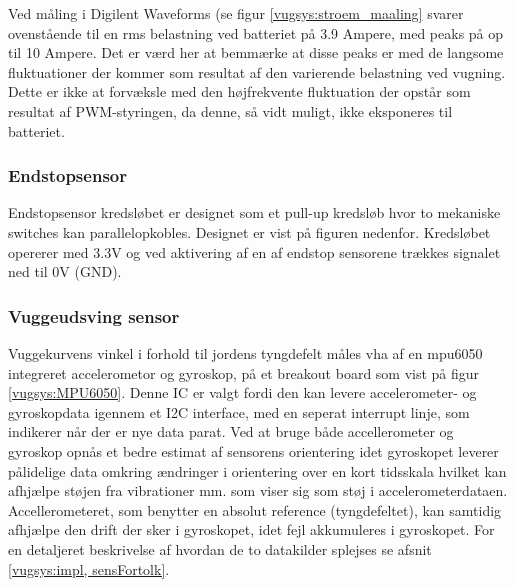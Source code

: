 
Ved måling i Digilent Waveforms (se figur \ref{vugsys:stroem_maaling} svarer ovenstående til en rms belastning ved batteriet på 3.9 Ampere, med peaks på op til 10 Ampere. Det er værd her at bemmærke at disse peaks er med de langsome fluktuationer der kommer som resultat af den varierende belastning ved vugning. Dette er ikke at forvæksle med den højfrekvente fluktuation der opstår som resultat af PWM-styringen, da denne, så vidt muligt, ikke eksponeres til batteriet. 



\subsubsection{Endstopsensor}\label{Vuggesystem: Design_ES} 
Endstopsensor kredsløbet er designet som et pull-up kredsløb hvor to mekaniske switches kan parallelopkobles. Designet er vist på figuren nedenfor.
Kredsløbet opererer med 3.3V og ved aktivering af en af endstop sensorene trækkes signalet ned til 0V (GND).

\subsubsection{Vuggeudsving sensor}
\label{Vuggesystem: Design_Vugggeudsving_sensor} 
Vuggekurvens vinkel i forhold til jordens tyngdefelt måles vha af en mpu6050 integreret accelerometor og gyroskop, på et breakout board som vist på figur \ref{vugsys:MPU6050}. Denne IC er valgt fordi den kan levere accelerometer- og gyroskopdata igennem et I2C interface, med en seperat interrupt linje, som indikerer når der er nye data parat. Ved at bruge både accellerometer og gyroskop opnås et bedre estimat af sensorens orientering idet gyroskopet leverer pålidelige data omkring ændringer i orientering over en kort tidsskala hvilket kan afhjælpe støjen fra vibrationer mm. som viser sig som støj i accelerometerdataen. Accellerometeret, som benytter en absolut reference (tyngdefeltet), kan samtidig afhjælpe den drift der sker i gyroskopet, idet fejl akkumuleres i gyroskopet. For en detaljeret beskrivelse af hvordan de to datakilder splejses se afsnit \vref{vugsys:impl, sensFortolk}.

